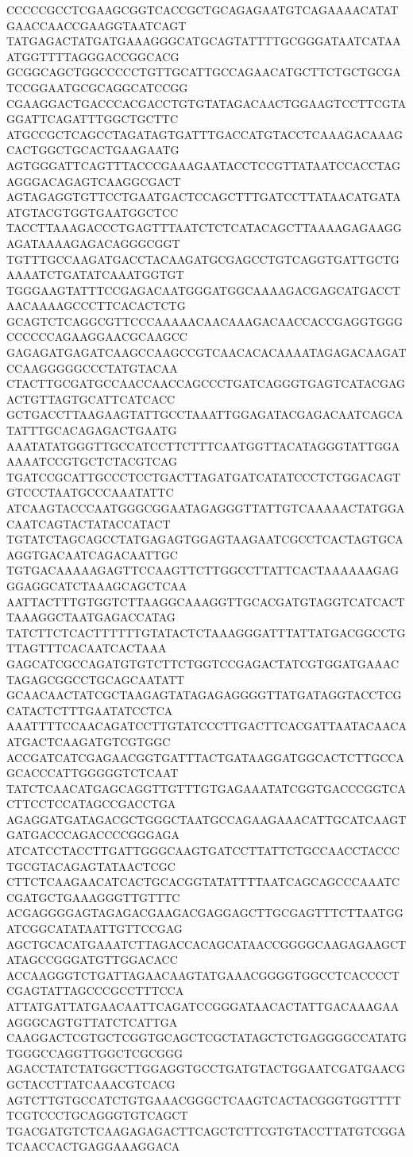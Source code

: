 CCCCCGCCTCGAAGCGGTCACCGCTGCAGAGAATGTCAGAAAACATATGAACCAACCGAAGGTAATCAGT
TATGAGACTATGATGAAAGGGCATGCAGTATTTTGCGGGATAATCATAAATGGTTTTAGGGACCGGCACG
GCGGCAGCTGGCCCCCTGTTGCATTGCCAGAACATGCTTCTGCTGCGATCCGGAATGCGCAGGCATCCGG
CGAAGGACTGACCCACGACCTGTGTATAGACAACTGGAAGTCCTTCGTAGGATTCAGATTTGGCTGCTTC
ATGCCGCTCAGCCTAGATAGTGATTTGACCATGTACCTCAAAGACAAAGCACTGGCTGCACTGAAGAATG
AGTGGGATTCAGTTTACCCGAAAGAATACCTCCGTTATAATCCACCTAGAGGGACAGAGTCAAGGCGACT
AGTAGAGGTGTTCCTGAATGACTCCAGCTTTGATCCTTATAACATGATAATGTACGTGGTGAATGGCTCC
TACCTTAAAGACCCTGAGTTTAATCTCTCATACAGCTTAAAAGAGAAGGAGATAAAAGAGACAGGGCGGT
TGTTTGCCAAGATGACCTACAAGATGCGAGCCTGTCAGGTGATTGCTGAAAATCTGATATCAAATGGTGT
TGGGAAGTATTTCCGAGACAATGGGATGGCAAAAGACGAGCATGACCTAACAAAAGCCCTTCACACTCTG
GCAGTCTCAGGCGTTCCCAAAAACAACAAAGACAACCACCGAGGTGGGCCCCCCAGAAGGAACGCAAGCC
GAGAGATGAGATCAAGCCAAGCCGTCAACACACAAAATAGAGACAAGATCCAAGGGGGCCCTATGTACAA
CTACTTGCGATGCCAACCAACCAGCCCTGATCAGGGTGAGTCATACGAGACTGTTAGTGCATTCATCACC
GCTGACCTTAAGAAGTATTGCCTAAATTGGAGATACGAGACAATCAGCATATTTGCACAGAGACTGAATG
AAATATATGGGTTGCCATCCTTCTTTCAATGGTTACATAGGGTATTGGAAAAATCCGTGCTCTACGTCAG
TGATCCGCATTGCCCTCCTGACTTAGATGATCATATCCCTCTGGACAGTGTCCCTAATGCCCAAATATTC
ATCAAGTACCCAATGGGCGGAATAGAGGGTTATTGTCAAAAACTATGGACAATCAGTACTATACCATACT
TGTATCTAGCAGCCTATGAGAGTGGAGTAAGAATCGCCTCACTAGTGCAAGGTGACAATCAGACAATTGC
TGTGACAAAAAGAGTTCCAAGTTCTTGGCCTTATTCACTAAAAAAGAGGGAGGCATCTAAAGCAGCTCAA
AATTACTTTGTGGTCTTAAGGCAAAGGTTGCACGATGTAGGTCATCACTTAAAGGCTAATGAGACCATAG
TATCTTCTCACTTTTTTGTATACTCTAAAGGGATTTATTATGACGGCCTGTTAGTTTCACAATCACTAAA
GAGCATCGCCAGATGTGTCTTCTGGTCCGAGACTATCGTGGATGAAACTAGAGCGGCCTGCAGCAATATT
GCAACAACTATCGCTAAGAGTATAGAGAGGGGTTATGATAGGTACCTCGCATACTCTTTGAATATCCTCA
AAATTTTCCAACAGATCCTTGTATCCCTTGACTTCACGATTAATACAACAATGACTCAAGATGTCGTGGC
ACCGATCATCGAGAACGGTGATTTACTGATAAGGATGGCACTCTTGCCAGCACCCATTGGGGGTCTCAAT
TATCTCAACATGAGCAGGTTGTTTGTGAGAAATATCGGTGACCCGGTCACTTCCTCCATAGCCGACCTGA
AGAGGATGATAGACGCTGGGCTAATGCCAGAAGAAACATTGCATCAAGTGATGACCCAGACCCCGGGAGA
ATCATCCTACCTTGATTGGGCAAGTGATCCTTATTCTGCCAACCTACCCTGCGTACAGAGTATAACTCGC
CTTCTCAAGAACATCACTGCACGGTATATTTTAATCAGCAGCCCAAATCCGATGCTGAAAGGGTTGTTTC
ACGAGGGGAGTAGAGACGAAGACGAGGAGCTTGCGAGTTTCTTAATGGATCGGCATATAATTGTTCCGAG
AGCTGCACATGAAATCTTAGACCACAGCATAACCGGGGCAAGAGAAGCTATAGCCGGGATGTTGGACACC
ACCAAGGGTCTGATTAGAACAAGTATGAAACGGGGTGGCCTCACCCCTCGAGTATTAGCCCGCCTTTCCA
ATTATGATTATGAACAATTCAGATCCGGGATAACACTATTGACAAAGAAAGGGCAGTGTTATCTCATTGA
CAAGGACTCGTGCTCGGTGCAGCTCGCTATAGCTCTGAGGGGCCATATGTGGGCCAGGTTGGCTCGCGGG
AGACCTATCTATGGCTTGGAGGTGCCTGATGTACTGGAATCGATGAACGGCTACCTTATCAAACGTCACG
AGTCTTGTGCCATCTGTGAAACGGGCTCAAGTCACTACGGGTGGTTTTTCGTCCCTGCAGGGTGTCAGCT
TGACGATGTCTCAAGAGAGACTTCAGCTCTTCGTGTACCTTATGTCGGATCAACCACTGAGGAAAGGACA
